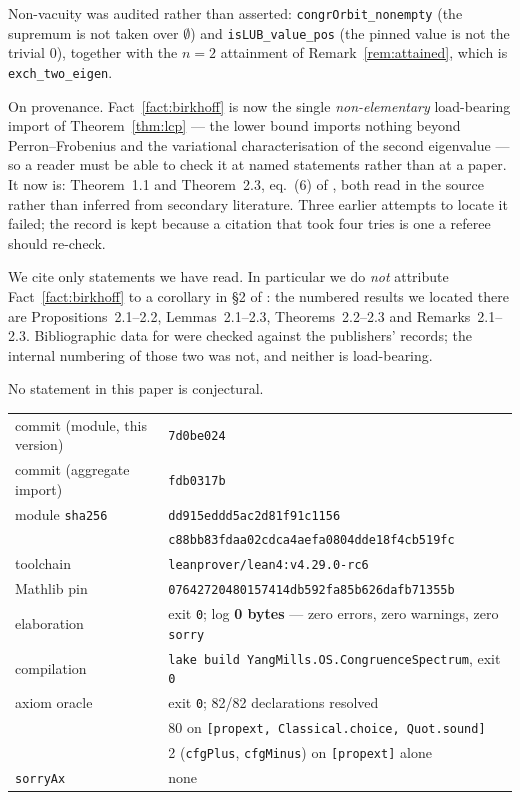 \documentclass[11pt,a4paper]{article}
\theoremstyle{plain}
\theoremstyle{definition}
\begin{document}
Non-vacuity was audited rather than asserted: \verb|congrOrbit_nonempty| (the
supremum is not taken over $\emptyset$) and \verb|isLUB_value_pos| (the pinned
value is not the trivial $0$), together with the $n=2$ attainment of
Remark~\ref{rem:attained}, which is \verb|exch_two_eigen|.

On provenance. Fact~\ref{fact:birkhoff} is now the single \emph{non-elementary}
load-bearing import of Theorem~\ref{thm:lcp} --- the lower bound imports nothing
beyond Perron--Frobenius and the variational characterisation of the second
eigenvalue --- so a
reader must be able to check it at named statements rather than at a paper. It
now is: Theorem~1.1 and Theorem~2.3, eq.~(6) of \cite{evesonnussbaum1995}, both
read in the source rather than inferred from secondary literature. Three earlier
attempts to locate it failed; the record is kept because a citation that took
four tries is one a referee should re-check.

We cite only statements we have read. In particular we do \emph{not} attribute
Fact~\ref{fact:birkhoff} to a corollary in \S2 of \cite{evesonnussbaum1995}: the
numbered results we located there are Propositions~2.1--2.2, Lemmas~2.1--2.3,
Theorems~2.2--2.3 and Remarks~2.1--2.3. Bibliographic data for
\cite{birkhoff1957,seneta2006} were checked against the publishers' records; the
internal numbering of those two was not, and neither is load-bearing.

No statement in this paper is conjectural.

\begin{center}
\begin{tabular}{ll}
\toprule
commit (module, this version) & \texttt{7d0be024} \\
commit (aggregate import) & \texttt{fdb0317b} \\
module \texttt{sha256} & \texttt{dd915eddd5ac2d81f91c1156} \\
                       & \texttt{c88bb83fdaa02cdca4aefa0804dde18f4cb519fc} \\
toolchain & \texttt{leanprover/lean4:v4.29.0-rc6} \\
Mathlib pin & \texttt{07642720480157414db592fa85b626dafb71355b} \\
elaboration & exit \texttt{0}; log \textbf{0 bytes} --- zero errors, zero warnings, zero \texttt{sorry} \\
compilation & \texttt{lake build YangMills.OS.CongruenceSpectrum}, exit \texttt{0} \\
axiom oracle & exit \texttt{0}; 82/82 declarations resolved \\
             & 80 on \texttt{[propext, Classical.choice, Quot.sound]} \\
             & 2 (\texttt{cfgPlus}, \texttt{cfgMinus}) on \texttt{[propext]} alone \\
\texttt{sorryAx} & none \\
\bottomrule
\end{tabular}
\end{center}
\end{document}

